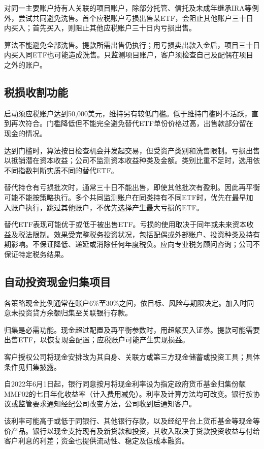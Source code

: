 \documentclass[UTF8,fontset=none,11pt,a4paper]{ctexart}
\begin{document}
对同一主要账户持有人关联的项目账户，除部分托管、信托及未成年继承IRA等例外，尝试共同避免洗售。首个应税账户亏损出售某ETF，会阻止其他账户三十日内买入；首先买入，则阻止其他应税账户三十日内\allowbreak\mbox{亏损出售。}


算法不能避免全部洗售。提款所需出售仍执行；用亏损卖出款入金后，项目三十日内买入同ETF也可能造成洗售。只监测项目账户，客户须检查自己及配偶在项目之\allowbreak\mbox{外的账户。}


\subsection*{税损收割功能}
启动须应税账户达到50,000美元，维持另有较低门槛。低于维持门槛时不活跃，直到再次符合。门槛降低但不能完全避免替代ETF单份价格过高，出售款部分留在现\allowbreak\mbox{金的情况。}


达到门槛时，算法按日检查机会并发起交易，但受资产类别和洗售限制。亏损出售以抵销潜在资本收益；公司不监测资本收益种类及金额。类别比重不足时，选用依不同指数判断实质不同的替代ETF。


替代持仓有亏损批次时，通常三十日不能出售，即使其他批次有盈利。因此再平衡可能不能按策略执行。多个共同监测账户在同类持有不同ETF时，优先在最早加入账户执行，跳过其他账户，不优先选择产生最大亏损的ETF。


替代ETF表现可能优于或低于被出售ETF。亏损的使用取决于同年或未来资本收益及税法限制。效果受完整税务投资状况，包括配偶或外部账户、投资种类及持有期影响。不保证降低、递延或消除任何年度税负。应向专业税务顾问咨询；公司不保证特定\allowbreak\mbox{税务结果。}


\subsection*{自动投资现金归集项目}
各策略现金比例通常在账户6\%至30\%之间，依目标、风险与期限决定。加入时同意未投资贷方余额归集至关联\allowbreak\mbox{银行存款。}


归集是必需功能。现金超过配置及再平衡参数时，用超额买入证券。提款可能需要出售ETF，以恢复现金配置；应税账户可能产生\allowbreak\mbox{实现损益。}


客户授权公司将现金安排改为其自身、关联方或第三方现金储蓄或投资工具；具体条件见\allowbreak\mbox{归集披露。}


自2022年6月1日起，银行同意按月将现金利率设为指定政府货币基金归集份额MMF02的七日年化收益率（计入费用减免）。利率及计算方法均可改变。银行按协议或监管要求通知经纪公司改变方法，公司收到后通\allowbreak\mbox{知客户。}


该利率可能高于或低于同银行、其他银行存款，以及经纪平台上货币基金等现金等价产品。银行以现金支持现有及新贷款和投资，其收入取决于贷款投资收益与付给客户利息的利差；资金也提供流动性、稳定及低\allowbreak\mbox{成本融资。}
\end{document}
